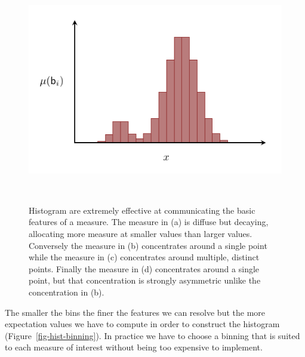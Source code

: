 \documentclass[
  letterpaper,
  DIV=11,
  numbers=noendperiod]{scrartcl}
\begin{document}
\begin{figure}
\begin{minipage}[t]{0.40\linewidth}
{{\includegraphics{figures/histograms/varying_behaviors/multimodal/multimodal.pdf}

}

}

\subcaption{\label{fig-hist-multimodal}}
\end{minipage}%
%
\begin{minipage}[t]{0.10\linewidth}

{\centering 

~

}

\end{minipage}%

\caption{\label{fig-hist-examples}Histogram are extremely effective at
communicating the basic features of a measure. The measure in (a) is
diffuse but decaying, allocating more measure at smaller values than
larger values. Conversely the measure in (b) concentrates around a
single point while the measure in (c) concentrates around multiple,
distinct points. Finally the measure in (d) concentrates around a single
point, but that concentration is strongly asymmetric unlike the
concentration in (b).}

\end{figure}

The smaller the bins the finer the features we can resolve but the more
expectation values we have to compute in order to construct the
histogram (Figure~\ref{fig-hist-binning}). In practice we have to choose
a binning that is suited to each measure of interest without being too
expensive to implement.
\end{document}
